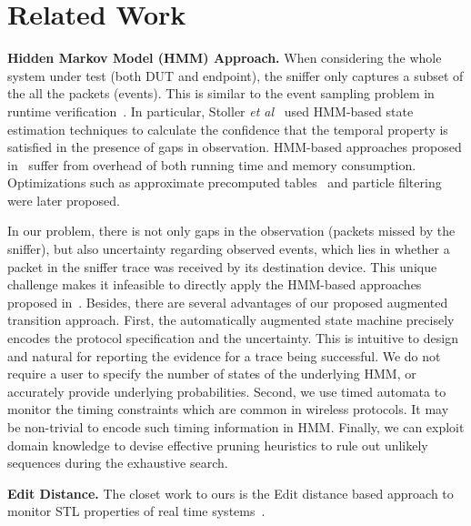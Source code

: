 \section{Related Work}
\label{sec:related}

\textbf{Hidden Markov Model (HMM) Approach.} When considering the whole system
under test (both DUT and endpoint), the sniffer only captures a subset of the
all the packets (events).  This is similar to the event sampling problem in
runtime
verification~\cite{bonakdarpour2011sampling,hauswirth2004low,arnold2008qvm,fei2006artemis,basin2012monitoring,sistla2011runtime}.
In particular, Stoller \textit{et al}~\cite{stoller2011runtime} used HMM-based
state estimation techniques to calculate the confidence that the temporal
property is satisfied in the presence of gaps in observation. HMM-based
approaches proposed in~\cite{stoller2011runtime} suffer from overhead of both
running time and memory consumption. Optimizations 
such as approximate precomputed tables~\cite{bartocci2012adaptive} and particle
filtering~\cite{kalajdzic2013runtime} were later proposed.

In our problem, there is not only gaps in the observation (packets missed by the
sniffer), but also uncertainty regarding observed events, which lies in whether
a packet in the sniffer trace was received by its destination device. This
unique challenge makes it infeasible to directly apply the HMM-based approaches
proposed in~\cite{stoller2011runtime}.
Besides, there are several advantages of our proposed augmented transition
approach. First, the automatically augmented state machine precisely encodes the
protocol specification and the uncertainty. This is intuitive to design and
natural for
reporting the evidence for a trace being successful. We do not require a user
to specify the number of states of the underlying HMM, or accurately provide
underlying probabilities. Second, we use timed automata to monitor the timing
constraints which are common in wireless protocols. It may be non-trivial to
encode such timing information in HMM. Finally, we can exploit domain knowledge
to devise effective pruning heuristics to rule out unlikely sequences during the
exhaustive search. 

\textbf{Edit Distance.} The closet work to ours is the Edit distance based approach
to monitor STL properties of real time systems~\cite{jakvsic2016quantitative}.

